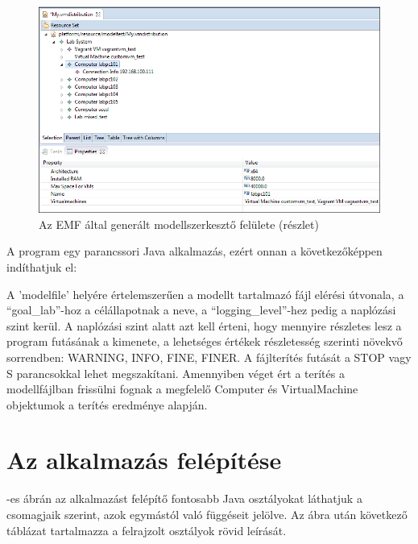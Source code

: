 \begin{figure}[ht]
\centering
\includegraphics[width=150mm, keepaspectratio]{figures/emfeditor.png}
\caption{Az EMF által generált modellszerkesztő felülete (részlet)}
\label{fig:emfeditor}
\end{figure}


A program egy parancssori Java alkalmazás, ezért onnan a következőképpen indíthatjuk el:


A 'modelfile' helyére értelemszerűen a modellt tartalmazó fájl elérési útvonala, a ``goal\_lab''-hoz a célállapotnak a neve, a ``logging\_level''-hez pedig a naplózási szint kerül. A naplózási szint alatt azt kell érteni, hogy mennyire részletes lesz a program futásának a kimenete, a lehetséges értékek részletesség szerinti növekvő sorrendben: WARNING, INFO, FINE, FINER.
A fájlterítés futását a STOP vagy S parancsokkal lehet megszakítani. Amennyiben véget ért a terítés a modellfájlban frissülni fognak a megfelelő Computer és VirtualMachine objektumok a terítés eredménye alapján.

\section{Az alkalmazás felépítése}
\label{impl_app}

-es ábrán az alkalmazást felépítő fontosabb Java osztályokat láthatjuk a csomagjaik szerint, azok egymástól való függéseit jelölve. Az ábra után következő táblázat tartalmazza a felrajzolt osztályok rövid leírását.

